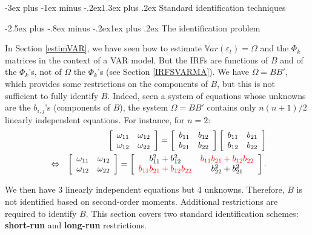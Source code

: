 \documentclass[
  11pt,
]{book}
\makeatletter
\renewcommand\section{\@startsection{section}{1}{\z@}
  {-3ex plus -1ex minus -.2ex}{1.3ex plus .2ex}
  {\normalfont\Large\bfseries\color{TextbookInk}}}
\renewcommand\subsection{\@startsection{subsection}{2}{\z@}
  {-2.5ex plus -.8ex minus -.2ex}{1ex plus .2ex}
  {\normalfont\large\bfseries\color{TextbookInk}}}
\theoremstyle{definition}
\theoremstyle{definition}
\theoremstyle{definition}
\theoremstyle{definition}
\theoremstyle{remark}
\makeatother
\begin{document}
\section{Standard identification techniques}\label{identifStruct}

\subsection{The identification problem}\label{IdentifPbm}

In Section \ref{estimVAR}, we have seen how to estimate \(\mathbb{V}ar(\varepsilon_t) =\Omega\) and the \(\Phi_k\) matrices in the context of a VAR model. But the IRFs are functions of \(B\) and of the \(\Phi_k\)'s, not of \(\Omega\) the \(\Phi_k\)'s (see Section \ref{IRFSVARMA}). We have \(\Omega = BB'\), which provides some restrictions on the components of \(B\), but this is not sufficient to fully identify \(B\). Indeed, seen a system of equations whose unknowns are the \(b_{i,j}\)'s (components of \(B\)), the system \(\Omega = BB'\) contains only \(n(n+1)/2\) linearly independent equations. For instance, for \(n=2\):
\begin{eqnarray*}
&&\left[
\begin{array}{cc}
\omega_{11} & \omega_{12} \\
\omega_{12} & \omega_{22}
\end{array}
\right] = \left[
\begin{array}{cc}
b_{11} & b_{12} \\
b_{21} & b_{22}
\end{array}
\right]\left[
\begin{array}{cc}
b_{11} & b_{21} \\
b_{12} & b_{22}
\end{array}
\right]\\
&\Leftrightarrow&\left[
\begin{array}{cc}
\omega_{11} & \omega_{12} \\
\omega_{12} & \omega_{22}
\end{array}
\right] = \left[
\begin{array}{cc}
b_{11}^2+b_{12}^2 & {\color{red}b_{11}b_{21}+b_{12}b_{22}} \\
{\color{red}b_{11}b_{21}+b_{12}b_{22}} & b_{22}^2 + b_{21}^2
\end{array}
\right].
\end{eqnarray*}

We then have 3 linearly independent equations but 4 unknowns. Therefore, \(B\) is not identified based on second-order moments. Additional restrictions are required to identify \(B\). This section covers two standard identification schemes: \textbf{short-run} and \textbf{long-run} restrictions.
\end{document}
